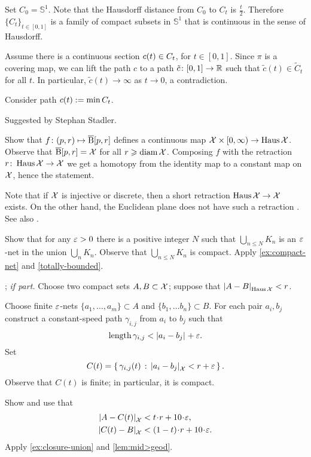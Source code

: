 Set $C_0=\mathbb{S}^1$.
Note that the Hausdorff distance from $C_0$ to $C_t$ is $\tfrac t2$.
Therefore $\{C_t\}_{t\in[0,1]}$ is a family of compact subsets in $\mathbb{S}^1$ that is continuous in the sense of Hausdorff.

Assume there is a continuous section $c(t)\z\in C_t$, for $t\in [0,1]$.
Since $\pi$ is a covering map,
we can lift the path $c$ to a path $\tilde c\colon[0,1]\to \mathbb{R}$ such that $\tilde c(t)\in \tilde C_t$ for all $t$.
In particular, $\tilde c(t)\to\infty$ as $t\to0$,
a contradiction.

Consider path $c(t)\mathrel{:=}\min C_t$.

 Suggested by Stephan Stadler.

Show that $f\colon(p,r)\mapsto \overline{\mathrm{B}}{}[p,r]$ defines a continuous map $\spc{X}\z\times[0,\infty)\to \Haus\spc{X}$.
Observe that $\overline{\mathrm{B}}{}[p,r]=\mathcal{X}$ for all $r\geqslant\operatorname{\rm diam}\nolimits\mathcal{X}$.
Composing $f$ with the retraction $r\colon\operatorname{\rm Haus}\nolimits\mathcal{X}\to \mathcal{X}$ we get a homotopy from the identity map to a constant map on $\mathcal{X}$, hence the statement.

Note that if $\mathcal{X}$ is injective or discrete, then a short retraction $\operatorname{\rm Haus}\nolimits\mathcal{X}\to \mathcal{X}$ exists.
On the other hand, the Euclidean plane does not have such a retraction \cite{petrunin-2022-MO-center, przeslawski-yost}.
See also \cite{petrunin-435157}.

Show that for any $\varepsilon>0$ there is a positive integer $N$ such that $\bigcup_{n\le N} K_n$ is an $\varepsilon$-net in the union $\bigcup_{n} K_n$.
Observe that $\bigcup_{n\le N} K_n$
is compact.
Apply \ref{ex:compact-net} and \ref{totally-bounded}.

\parbf{\ref{ex:Haus-length}}; \textit{if part.}
Choose two compact sets $A,B\z\subset \spc{X}$;
suppose that $\dist{A}{B}{\Haus\spc{X}}<r$.

Choose finite $\varepsilon$-nets $\{a_1,\dots,a_m\}\subset A$ and $\{b_1,\dots b_n\}\subset B$.
For each pair $a_i,b_j$ construct a constant-speed path $\gamma_{i,j}$ from $a_i$ to $b_j$ such that 
\[\length \gamma_{i,j}<\dist{a_i}{b_j}{}+\eps.\]
Set 
\[C(t)=\set{\gamma_{i,j}(t)}{\dist{a_i}{b_j}{\spc{X}}<r+\eps}.\]
Observe that $C(t)$ is finite; in particular, it is compact.

Show and use that 
\begin{align*}
\dist{A}{C(t)}{\spc{X}}&<t\cdot r+10\cdot\eps,
\\
\dist{C(t)}{B}{\spc{X}}&<(1-t)\cdot r+10\cdot\eps.
\end{align*}
Apply \ref{ex:closure-union} and \ref{lem:mid>geod}.

